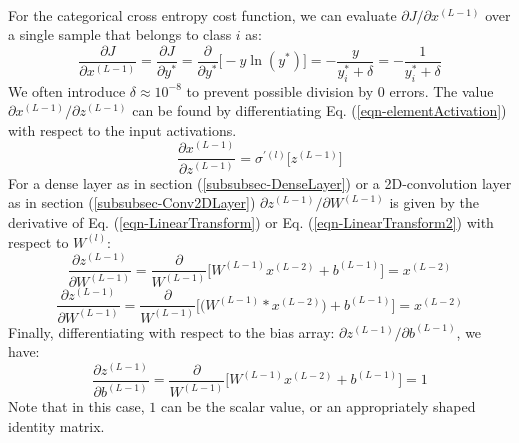 \documentclass[12pt,letterpaper]{article}
\begin{document}
\paragraph*{}For the categorical cross entropy cost function, we can evaluate $\partial J / \partial x^{(L-1)}$ over a single sample that belongs to class $i$ as:
\begin{equation}
\label{eqn-CXELossDeriv}
\frac{\partial J}{\partial x^{(L-1)}} = \frac{\partial J}{\partial y^*} =
\frac{\partial}{\partial y^*}\Big[ -y \ln (y^*) \Big] = -\frac{y}{y^*_i + \delta} = -\frac{1}{y^*_i + \delta}
\end{equation}
We often introduce $\delta \approx 10^{-8}$ to prevent possible division by $0$ errors. The value $\partial x^{(L-1)} / \partial z^{(L-1)}$ can be found by differentiating Eq. (\ref{eqn-elementActivation}) with respect to the input activations.
\begin{equation}
\frac{\partial x^{(L-1)}}{\partial z^{(L-1)}} = \sigma^{'(l)} \big[ z^{(L-1)} \big]
\end{equation}
For a dense layer as in section (\ref{subsubsec-DenseLayer}) or a 2D-convolution layer as in section (\ref{subsubsec-Conv2DLayer}) $\partial z^{(L-1)} / \partial W^{(L-1)}$ is given by the derivative of Eq. (\ref{eqn-LinearTransform}) or Eq. (\ref{eqn-LinearTransform2}) with respect to $W^{(l)}$:
\begin{equation}
\frac{\partial z^{(L-1)}}{\partial W^{(L-1)}} = 
\frac{\partial}{W^{(L-1)}}\Big[ W^{(L-1)}x^{(L-2)} + b^{(L-1)}\Big] = x^{(L-2)}
\end{equation}
\begin{equation}
\frac{\partial z^{(L-1)}}{\partial W^{(L-1)}} = 
\frac{\partial}{W^{(L-1)}}\Big[ \big( W^{(L-1)} * x^{(L-2)} \big) + b^{(L-1)}\Big] = x^{(L-2)}
\end{equation}
Finally, differentiating with respect to the bias array: $\partial z^{(L-1)} / \partial b^{(L-1)}$, we have:
\begin{equation}
\frac{\partial z^{(L-1)}}{\partial b^{(L-1)}} = \frac{\partial}{W^{(L-1)}}\Big[ W^{(L-1)}x^{(L-2)} + b^{(L-1)}\Big] = 1
\end{equation}
Note that in this case, $1$ can be the scalar value, or an appropriately shaped identity matrix.
\end{document}
